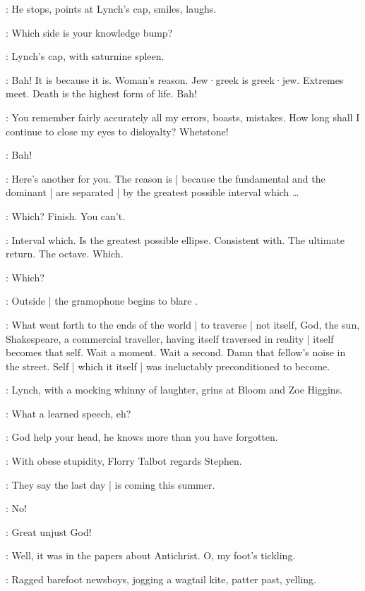 :
He stops,
points at Lynch's cap,
smiles,
laughs.

\Stephen:
Which side is your knowledge bump?

:
Lynch's cap,
with saturnine spleen.

\Cap:
Bah!
It is because it is.
Woman's reason.
Jew·greek is greek·jew.
Extremes meet.
Death is the highest form of life.
Bah!

\Stephen:
You remember fairly accurately all my errors,
boasts,
mistakes.
How long shall I continue to close my eyes to disloyalty?
Whetstone!

\Cap[1]:
Bah!

\Stephen:
Here's another for you.
The reason is |
because the fundamental and the dominant |
are separated |
by the greatest possible interval which \ldots

\Cap:
Which?
Finish.
You can't.

\Stephen:
Interval which.
Is the greatest possible ellipse.
Consistent with.
The ultimate return.
The octave.
Which.

\Cap:
Which?

:
Outside |
the gramophone begins to blare .

\Stephen:
What went forth to the ends of the world |
to traverse |
not itself,
God,
the sun,
Shakespeare,
a commercial traveller,
having itself traversed in reality |
itself becomes that self.
Wait a moment.
Wait a second.
Damn that fellow's noise in the street.
Self |
which it itself |
was ineluctably preconditioned to become.

:
Lynch,
with a mocking whinny of laughter,
grins at Bloom and Zoe Higgins.

\Lynch:
What a learned speech,
eh?

\Zoe:
God help your head,
he knows more than you have forgotten.

:
With obese stupidity,
Florry Talbot regards Stephen.

\Florry:
They say the last day |
is coming this summer.

\Kitty:
No!

\Zoe:
Great unjust God!

\Florry:
Well,
it was in the papers about Antichrist.
O,
my foot's tickling.

:
Ragged barefoot newsboys,
jogging a wagtail kite,
patter past,
yelling.

